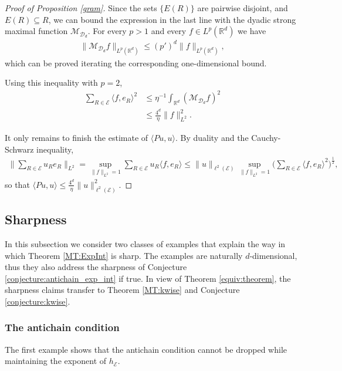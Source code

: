 \documentclass[oneside]{amsart}
\theoremstyle{definition}
\theoremstyle{plain}
\numberwithin{equation}{section}
\numberwithin{theorem}{section}
\begin{document}
\begin{proof}[Proof of Proposition \ref{gram}]
  Since the sets $\{E(R)\}$ are pairwise disjoint, and $E(R) \subseteq R$, we
  can bound the expression in the last line with the dyadic
  strong maximal function $\mathcal{M}_{\mathcal{D}_d}$.
  For every $p > 1$ and every $f \in L^p(\mathbb{R}^d)$ we have
  \begin{align}
    \label{doob}
    \|\mathcal{M}_{\mathcal{D}_d}f\|_{L^p(\mathbb{R}^d)} \leq (p')^d
    \|f\|_{L^p(\mathbb{R}^d)},
  \end{align}
  which can be proved iterating the corresponding one-dimensional bound.

  Using this inequality with $p=2$,
  \begin{align*}
    \sum_{R \in \mathcal{E}} \langle f, e_R \rangle^2 &\leq
    \eta^{-1} \int_{\mathbb{R}^d} (\mathcal{M}_{\mathcal{D}_d} f)^2 \\
    &\leq \frac{4^{d}}{\eta} \|f\|_{L^2}^2.
  \end{align*}

  It only remains to finish the estimate of $\langle Pu, u \rangle$.
  By duality and the Cauchy-Schwarz inequality,
  \begin{align*}
    \bigg\| \sum_{R \in \mathcal{E}} u_R e_R \bigg\|_{L^2}
    = \sup_{\|f\|_{L^2} = 1} \sum_{R \in \mathcal{E}} u_R
      \langle f, e_R \rangle
    \leq \|u\|_{\ell^2(\mathcal{E})} \sup_{\|f\|_{L^2} = 1}
      \bigg( \sum_{R \in \mathcal{E}} \langle f, e_R \rangle^2
      \bigg)^{\frac{1}{2}},
  \end{align*}
  so that $\langle Pu, u \rangle \leq \frac{4^d}{\eta}
  \|u\|_{\ell^2(\mathcal{E})}^2$.
\end{proof}

\subsection{Sharpness} \label{sec:heights:sharp}

In this subsection we consider two classes of examples that explain the way in
which Theorem \ref{MT:ExpInt} is sharp.
The examples are naturally $d$-dimensional, thus they also address the sharpness
of Conjecture \ref{conjecture:antichain_exp_int} if true.
In view of Theorem \ref{equiv:theorem}, the sharpness claims transfer to Theorem
\ref{MT:kwise} and Conjecture \ref{conjecture:kwise}.

\subsubsection{The antichain condition}
The first example shows that the antichain condition cannot be dropped while
maintaining the exponent of $h_{\mathcal{E}}$.
\end{document}
